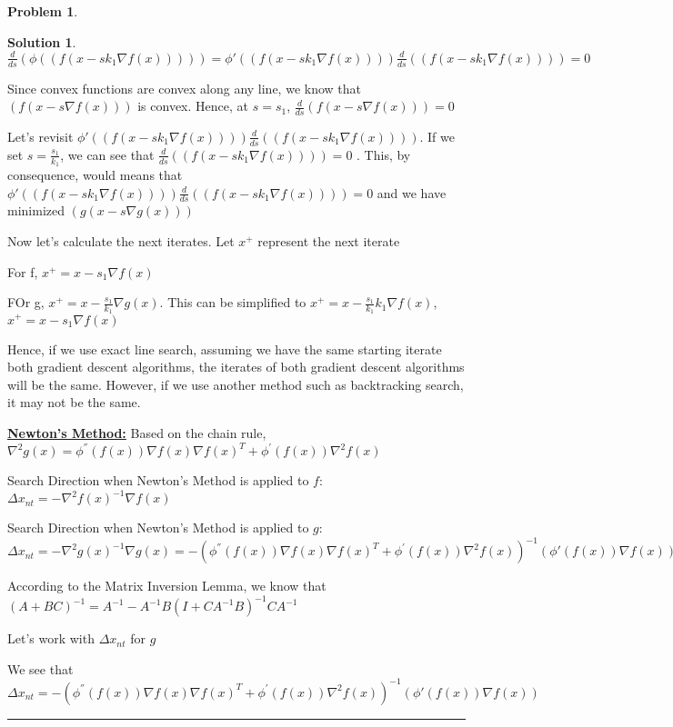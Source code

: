 \documentclass{article}
\theoremstyle{definition}
\newtheorem{problem}{Problem}
\def\fline{\rule{0.75\linewidth}{0.5pt}}
\newcommand{\finishline}{\begin{center}\fline\end{center}}
\newtheorem*{solution*}{Solution}
\newenvironment{solution}{\begin{solution*}}{{\finishline} \end{solution*}}
\begin{document}
\begin{problem}
\begin{solution}
    $\frac{d}{ds} (\phi((f(x - sk_1 \nabla f(x))))) = \phi'((f(x - sk_1 \nabla f(x)))) \frac{d}{ds} ((f(x - sk_1 \nabla f(x)))) = 0$

    Since convex functions are convex along any line, we know that $(f(x - s\nabla f(x)))$ is convex. Hence, at $s = s_1$, $\frac{d}{ds}(f(x - s\nabla f(x))) = 0$ \newline 

    Let's revisit $\phi'((f(x - sk_1 \nabla f(x)))) \frac{d}{ds} ((f(x - sk_1 \nabla f(x))))$. If we set $s = \frac{s_1}{k_1}$, we can see that $\frac{d}{ds} ((f(x - sk_1 \nabla f(x)))) = 0$ . This, by consequence, would means that $\phi'((f(x - sk_1 \nabla f(x)))) \frac{d}{ds} ((f(x - sk_1 \nabla f(x)))) = 0$ and we have minimized $(g(x - s\nabla g(x)))$

    Now let's calculate the next iterates. \newline 
    Let $x^+$ represent the next iterate

    For f, $x^+ = x - s_1 \nabla f(x)$

    FOr g, $x^+ = x - \frac{s_1}{k_1} \nabla g(x)$. This can be simplified to $x^+ = x - \frac{s_1}{k_1} k_1 \nabla f(x)$, $x^+ = x - s_1 \nabla f(x)$

    Hence, if we use exact line search, assuming we have the same starting iterate both gradient descent algorithms, the iterates of both gradient descent algorithms will be the same. However, if we use another method such as backtracking search, it may not be the same. 

\textbf{\underline{Newton's Method:}} \newline 
Based on the chain rule, $\nabla^2g(x) = \phi^{''}(f(x)) \nabla f(x) \nabla f(x)^T + \phi^{'}(f(x))\nabla^2f(x)$

Search Direction when Newton's Method is applied to $f$: $\Delta x_{nt} = -\nabla^2f(x)^{-1} \nabla f(x)$

Search Direction when Newton's Method is applied to $g$: $\Delta x_{nt} = -\nabla^2g(x)^{-1} \nabla g(x) = -(\phi^{''}(f(x)) \nabla f(x) \nabla f(x)^T + \phi^{'}(f(x))\nabla^2f(x))^{-1} ( \phi'(f(x)) \nabla f(x))$


According to the Matrix Inversion Lemma, we know that $(A + BC)^{-1} = A^{-1} - A^{-1}B (I + CA^{-1}B)^{-1} CA^{-1}$ \newline 

Let's work with $\Delta x_{nt}$ for $g$ 

We see that $\Delta x_{nt} = -(\phi^{''}(f(x)) \nabla f(x) \nabla f(x)^T + \phi^{'}(f(x))\nabla^2f(x))^{-1} ( \phi'(f(x)) \nabla f(x))$ \newline 


\end{solution}
\end{problem}
\end{document}

